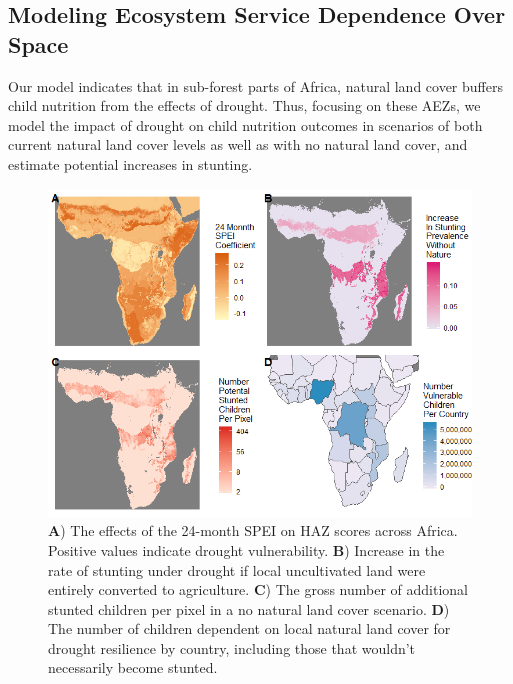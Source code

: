 \documentclass{article}
\begin{document}
\subsection{Modeling Ecosystem Service Dependence Over Space}
Our model indicates that in sub-forest parts of Africa, natural land cover buffers child nutrition from the effects of drought.  Thus, focusing on these AEZs, we model the impact of drought on child nutrition outcomes in scenarios of both current natural land cover levels as well as with no natural land cover, and estimate potential increases in stunting.

\begin{figure}[h!]
	\begin{center}
		\includegraphics[width=0.8\linewidth]{AfricaEffects.png}
		\caption{\textbf{A}) The effects of the 24-month SPEI on HAZ scores across Africa.  Positive values indicate drought vulnerability. \textbf{B}) Increase in the rate of stunting under drought if local uncultivated land were entirely converted to agriculture.  \textbf{C}) The gross number of additional stunted children per pixel in a no natural land cover scenario. \textbf{D}) The number of children dependent on local natural land cover for drought resilience by country, including those that wouldn't necessarily become stunted.}
		\label{fig:AfricaEffects.png}
	\end{center}
\end{figure}
\end{document}
